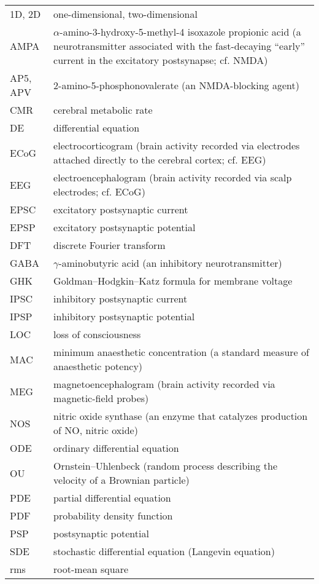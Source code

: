 \begin{tabular*}{\linewidth}{p{\the\tmpleft}p{\the\tmpright}}
%
1D, 2D & one-dimensional, two-dimensional \\
AMPA   & $\alpha$-amino-3-hydroxy-5-methyl-4 isoxazole propionic acid
	(a neurotransmitter associated with the fast-decaying ``early''  
	current in the excitatory postsynapse; cf. NMDA)\\
AP5, APV    & 2-amino-5-phosphonovalerate (an NMDA-blocking agent)\\
CMR & cerebral metabolic rate \\
DE	& differential equation\\
ECoG   & electrocorticogram (brain activity recorded via electrodes
	attached directly to the cerebral cortex; cf. EEG)\\
EEG    & electroencephalogram (brain activity recorded via scalp
	electrodes; cf. ECoG)\\
EPSC   & excitatory postsynaptic current \\
EPSP   & excitatory postsynaptic potential \\
DFT  & discrete Fourier transform \\
GABA  & $\gamma$-aminobutyric acid (an inhibitory neurotransmitter)\\
GHK & Goldman--Hodgkin--Katz formula for membrane voltage \\
IPSC   & inhibitory postsynaptic current \\
IPSP   & inhibitory postsynaptic potential \\
LOC	& loss of consciousness \\
MAC & minimum anaesthetic concentration (a standard measure of anaesthetic
potency) \\
MEG & magnetoencephalogram (brain activity recorded via magnetic-field
	probes) \\
NOS & nitric oxide synthase (an enzyme that catalyzes production of NO,
	nitric oxide) \\
ODE	& ordinary differential equation \\
OU  & Ornstein--Uhlenbeck (random process describing the 
	velocity of a Brownian particle) \\
PDE	& partial differential equation \\
PDF	& probability density function \\
PSP    & postsynaptic potential \\
SDE	& stochastic differential equation (Langevin equation) \\
rms    & root-mean square \\
%
\end{tabular*}
